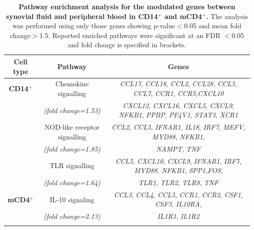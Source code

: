 \begin{landscape}
\begin{center}
\begin{longtable}[ht]{c c c }
\caption[Pathway enrichment analysis for the modulated genes between synovial fluid and peripheral blood in CD14$^+$ and mCD4$^+$.]{\textbf{Pathway enrichment analysis for the modulated genes between synovial fluid and peripheral blood in CD14$^+$ and mCD4$^+$.} The analysis was performed using only those genes showing p-value$<$0.05 and mean fold change$>$1.5. Reported enriched pathways were significant at an FDR $<$0.05 and fold change is specified in brackets.}
\label{table:PSA_PCR_array_pathway_analysis} \\
\toprule
\textbf{Cell type} & \textbf{Pathway} & \textbf{Genes} \\						
\midrule
\midrule
\textbf{CD14$^+$} & Chemokine signalling & \textit{CCL17}, \textit{CCL18}, \textit{CCL2}, \textit{CCL28}, \textit{CCL5}, \textit{CCL7}, \textit{CCR1}, \textit{CCR5},\textit{CXCL10} \\  
									& \textit{(fold change=1.53)}   & \textit{CXCL12}, \textit{CXCL16}, \textit{CXCL5}, \textit{CXCL9}, \textit{NFKB1}, \textit{PPBP}, \textit{PF4V1}, \textit{STAT3}, \textit{XCR1}\\
									
									& NOD-like receptor signalling & \textit{CCL2}, \textit{CCL5}, \textit{IFNAR1}, \textit{IL18}, \textit{IRF7}, \textit{MEFV}, \textit{MYD88}, \textit{NFKB1}, \\
								  & \textit{(fold change=1.85)}           & \textit{NAMPT}, \textit{TNF} \\

									& TLR signalling       & \textit{CCL5}, \textit{CXCL10}, \textit{CXCL9}, \textit{IFNAR1}, \textit{IRF7}, \textit{MYD88}, \textit{NFKB1}, \textit{SPP1},\textit{FOS},\\ 
								  & \textit{(fold change=1.64)}  & \textit{TLR1}, \textit{TLR2}, \textit{TLR8}, \textit{TNF}\\

\midrule
\textbf{mCD4$^+$} & IL-10 signaling & \textit{CCL3}, \textit{CCL4}, \textit{CCL5}, \textit{CCR1}, \textit{CCR2}, \textit{CSF1}, \textit{CSF3}, \textit{IL10RA}, \\
									& \textit{(fold change=2.13)} & \textit{IL1R1}, \textit{IL1R2}\\
\bottomrule
\medskip
\end{longtable}
\end{center}
\end{landscape}

